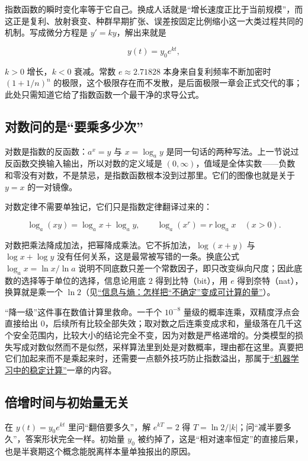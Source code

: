 指数函数的瞬时变化率等于它自己。换成人话就是``增长速度正比于当前规模''，而这正是复利、放射衰变、种群早期扩张、误差按固定比例缩小这一大类过程共同的机制。写成微分方程是 \(y'=ky\)，解出来就是

\[
y(t)=y_0e^{kt},
\]

\(k>0\) 增长，\(k<0\) 衰减。常数 \(e\approx2.71828\) 本身来自复利频率不断加密时 \((1+1/n)^n\) 的极限，这个极限存在而不发散，是后面极限一章会正式交代的事；此处只需知道它给了指数函数一个最干净的求导公式。

\subsection{对数问的是``要乘多少次''}

对数是指数的反函数：\(a^x=y\) 与 \(x=\log_a y\) 是同一句话的两种写法。上一节说过反函数交换输入输出，所以对数的定义域是 \((0,\infty)\)，值域是全体实数——负数和零没有对数，不是禁忌，是指数函数根本没到过那里。它们的图像也就是关于 \(y=x\) 的一对镜像。

对数定律不需要单独记，它们只是指数定律翻译过来的：

\[
\log_a(xy)=\log_a x+\log_a y,
\qquad
\log_a(x^r)=r\log_a x\quad(x>0).
\]

对数把乘法降成加法，把幂降成乘法。它不拆加法，\(\log(x+y)\) 与 \(\log x+\log y\) 没有任何关系，这是最常被写错的一条。换底公式 \(\log_a x=\ln x/\ln a\) 说明不同底数只差一个常数因子，即只改变纵向尺度；因此底数的选择等于单位的选择，信息论用底 \(2\) 得到比特（bit），用 \(e\) 得到奈特（nat），换算就是乘一个 \(\ln 2\)（见\hyperref[ch:054]{``信息与熵：怎样把``不确定''变成可计算的量''}）。

``降一级''这件事在数值计算里救命。一千个 \(10^{-8}\) 量级的概率连乘，双精度浮点会直接给出 \(0\)，后续所有比较全部失效；取对数之后连乘变成求和，量级落在几千这个安全范围内，比较大小的结论完全不变，因为对数是严格递增的。分类模型的损失写成对数似然而不是似然，采样算法里到处是对数概率，理由都在这里。真要把它们加起来而不是乘起来时，还需要一点额外技巧防止指数溢出，那属于\hyperref[ch:067]{``机器学习中的稳定计算''}一章的内容。

\subsection{倍增时间与初始量无关}

在 \(y(t)=y_0e^{kt}\) 里问``翻倍要多久''，解 \(e^{kT}=2\) 得 \(T=\ln 2/|k|\)；问``减半要多久''，答案形状完全一样。初始量 \(y_0\) 被约掉了，这是``相对速率恒定''的直接后果，也是半衰期这个概念能脱离样本量单独报出的原因。

